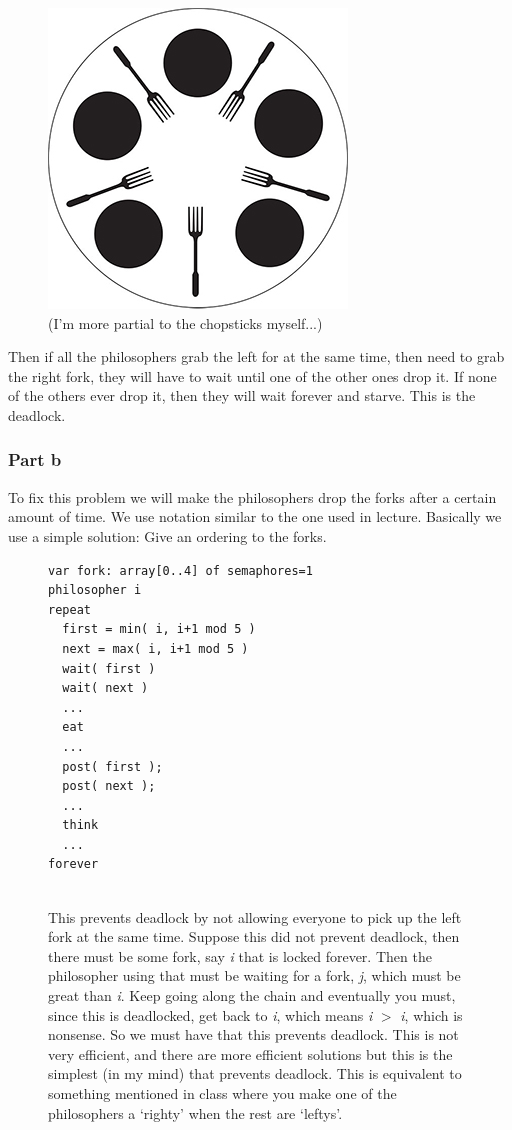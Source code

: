 \documentclass[english]{article}
\begin{document}
\begin{figure}[H]
 \centering 
 \includegraphics[scale=0.35]{dining-philosophers-problem-small.jpg}
 \caption{(I'm more partial to the chopsticks myself...)}
\end{figure}


Then if all the philosophers grab the left for at the same time, then need to grab the right fork, they will have to wait until one of the other ones drop it.
If none of the others ever drop it, then they will wait forever and starve. This is the deadlock.

\subsubsection*{Part b}
To fix this problem we will make the philosophers drop the forks after a certain amount of time. We use notation similar to the one used in lecture. Basically
we use a simple solution: Give an ordering to the forks. 

\begin{figure}[H]
\begin{lstlisting}
var fork: array[0..4] of semaphores=1
philosopher i
repeat
  first = min( i, i+1 mod 5 )
  next = max( i, i+1 mod 5 )
  wait( first )
  wait( next )
  ...
  eat
  ...
  post( first );
  post( next );
  ...
  think
  ...
forever
 
 \end{lstlisting}
 
 This prevents deadlock by not allowing everyone to pick up the left fork at the same time. Suppose this did not prevent deadlock, then there must be some fork, say \textit{i} 
 that is locked forever. Then the philosopher using that must be waiting for a fork, \textit{j}, which must be great than \textit{i}. Keep going along the chain and eventually
 you must, since this is deadlocked, get back to \textit{i}, which means \textit{i} $>$ \textit{i}, which is nonsense. So we must have that this prevents deadlock. This is not very
 efficient, and there are more efficient solutions but this is the simplest (in my mind) that prevents deadlock. This is equivalent to something mentioned in class where you
 make one of the philosophers a `righty' when the rest are `leftys'.
 
\end{figure}
\end{document}
